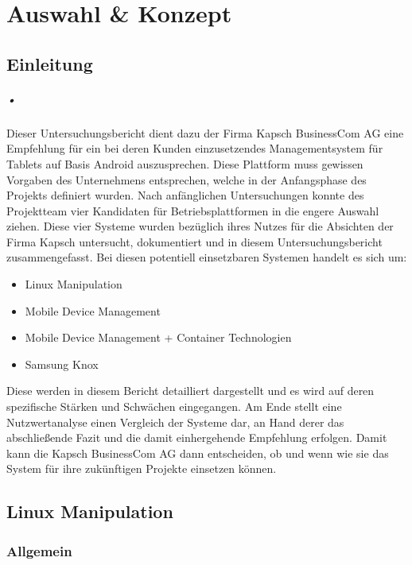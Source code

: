 \chapter{Auswahl \& Konzept}
\section{Einleitung}
\paragraph*{•}
Dieser Untersuchungsbericht dient dazu der Firma Kapsch BusinessCom AG eine Empfehlung für ein bei deren Kunden einzusetzendes Managementsystem für Tablets auf Basis Android auszusprechen. Diese Plattform muss gewissen Vorgaben des Unternehmens entsprechen, welche in der Anfangsphase des Projekts definiert wurden. Nach anfänglichen Untersuchungen konnte des Projektteam vier Kandidaten für Betriebsplattformen in die engere Auswahl ziehen. Diese vier Systeme wurden bezüglich ihres Nutzes für die Absichten der Firma Kapsch untersucht, dokumentiert und in diesem Untersuchungsbericht zusammengefasst. Bei diesen potentiell einsetzbaren Systemen handelt es sich um:
\begin{itemize}
	\item Linux Manipulation
	\item Mobile Device Management
	\item Mobile Device Management + Container Technologien
	\item Samsung Knox
\end{itemize}
Diese werden in diesem Bericht detailliert dargestellt und es wird auf deren spezifische Stärken und Schwächen eingegangen. Am Ende stellt eine Nutzwertanalyse einen Vergleich der Systeme dar, an Hand derer das abschließende Fazit und die damit einhergehende Empfehlung erfolgen. Damit kann die Kapsch BusinessCom AG dann entscheiden, ob und wenn wie sie das System für ihre zukünftigen Projekte einsetzen können. 

\section{Linux Manipulation}
\subsection{Allgemein}
